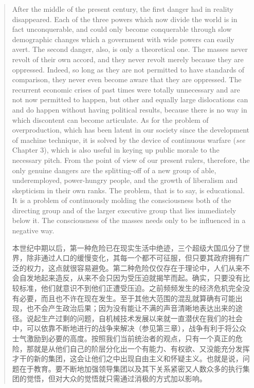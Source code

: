\begin{paracol}{2}
\begin{quotation}
After the middle of the present century, the first danger had in reality
disappeared. Each of the three powers which now divide the world is in
fact unconquerable, and could only become conquerable through slow
demographic changes which a government with wide powers can easily
avert. The second danger, also, is only a theoretical one. The masses
never revolt of their own accord, and they never revolt merely because
they are oppressed. Indeed, so long as they are not permitted to have
standards of comparison, they never even become aware that they are
oppressed. The recurrent economic crises of past times were totally
unnecessary and are not now permitted to happen, but other and equally
large dislocations can and do happen without having political results,
because there is no way in which discontent can become articulate. As
for the problem of overproduction, which has been latent in our society
since the development of machine technique, it is solved by the device
of continuous warfare (\emph{see} Chapter 3), which is also useful in
keying up public morale to the necessary pitch. From the point of view
of our present rulers, therefore, the only genuine dangers are the
splitting-off of a new group of able, underemployed, power-hungry
people, and the growth of liberalism and skepticism in their own ranks.
The problem, that is to say, is educational. It is a problem of
continuously molding the consciousness both of the directing group and
of the larger executive group that lies immediately below it. The
consciousness of the masses needs only to be influenced in a negative
way.

\switchcolumn

本世纪中期以后，第一种危险已在现实生活中绝迹，三个超级大国瓜分了世界，除非通过人口的缓慢变化，其每一个都不可征服，但只要其政府拥有广泛的权力，这点就很容易避免。第二种危险仅仅存在于理论中，人们从来不会自发地起来造反，从来不会只因为受压迫就揭竿而起。确实，只要没有比较标准，他们就意识不到他们正遭受压迫。之前频频发生的经济危机完全没有必要，而且也不许在现在发生。至于其他大范围的混乱就算确有可能出现，也不会产生政治后果；因为没有能让不满的声音清晰地表达出来的途径。说起生产过剩的问题，自机械技术发展以来就一直潜伏在我们的社会中，可以依靠不断地进行的战争来解决（参见第三章），战争有利于将公众士气激励到必要的高度。按照我们当前统治者的观点，只有一个真正的危险，那就是从他们自己的阶层分化出一个有能力、有权欲、又没能充分发挥才干的新的集团，这会让他们之中出现自由主义和怀疑主义。也就是说，问题在于教育。要不断地加强领导集团以及其下关系紧密又人数众多的执行集团的觉悟，但对大众的觉悟就只需通过消极的方式加以影响。


\end{quotation}
\end{paracol}
